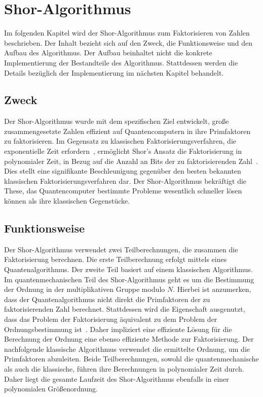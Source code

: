 \section{Shor-Algorithmus}
Im folgenden Kapitel wird der Shor-Algorithmus zum Faktorisieren von Zahlen beschrieben.
Der Inhalt bezieht sich auf den Zweck, die Funktionsweise und den Aufbau des Algorithmus.
Der Aufbau beinhaltet nicht die konkrete Implementierung der Bestandteile des Algorithmus.
Stattdessen werden die Details bezüglich der Implementierung im nächsten Kapitel behandelt.

\subsection{Zweck}
Der Shor-Algorithmus wurde mit dem spezifischen Ziel entwickelt, 
große zusammengesetzte Zahlen effizient auf Quantencomputern in ihre Primfaktoren zu faktorisieren. 
Im Gegensatz zu klassischen Faktorisierungsverfahren, die exponentielle Zeit erfordern~\cite{katz2023}, 
ermöglicht Shor's Ansatz die Faktorisierung in polynomialer Zeit, 
in Bezug auf die Anzahl an Bits der zu faktorisierenden Zahl~\cite{Shor_1997}. 
Dies stellt eine signifikante Beschleunigung gegenüber den besten bekannten klassischen Faktorisierungsverfahren dar.
Der Shor-Algorithmus bekräftigt die These, das Quantencomputer
bestimmte Probleme wesentlich schneller lösen können als ihre klassischen Gegenstücke.

\subsection{Funktionsweise} \label{Funktionsweise}
Der Shor-Algorithmus verwendet zwei Teilberechnungen, die zusammen die Faktorisierung berechnen.
Die erste Teilberechnung erfolgt mittels eines Quantenalgorithmus. 
Der zweite Teil basiert auf einem klassischen Algorithmus.
Im quantenmechanischen Teil des Shor-Algorithmus geht es um die Bestimmung der Ordnung in der multiplikativen Gruppe modulo \(N\).
Hierbei ist anzumerken, dass der Quantenalgorithmus nicht direkt die Primfaktoren der zu faktorisierenden Zahl berechnet.
Stattdessen wird die Eigenschaft ausgenutzt, 
dass das Problem der Faktorisierung äquivalent zu dem Problem der Ordnungsbestimmung ist~\cite{nielsen_chuang_2010}.
Daher impliziert eine effiziente Lösung für die Berechnung der Ordnung eine ebenso effiziente Methode zur Faktorisierung.
Der nachfolgende klassische Algorithmus verwendet die ermittelte Ordnung, 
um die Primfaktoren abzuleiten. 
Beide Teilberechnungen, sowohl die quantenmechanische als auch die klassische, 
führen ihre Berechnungen in polynomialer Zeit durch. 
Daher liegt die gesamte Laufzeit des Shor-Algorithmus ebenfalls in einer polynomialen Größenordnung.

